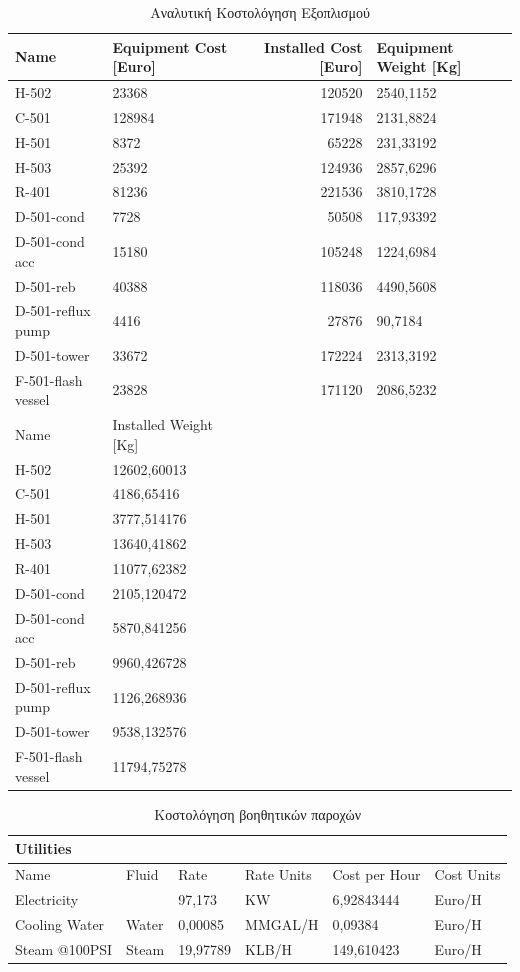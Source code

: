 \documentclass[11pt]{article}
\begin{document}
\begin{table}[htbp]
\caption{Αναλυτική Κοστολόγηση Εξοπλισμού}
\centering
\begin{tabular}{llrl}
\hline
Name & Equipment Cost [Euro] & Installed Cost [Euro] & Equipment Weight [Kg]\\
\hline
H-502 & 23368 & 120520 & 2540,1152\\
C-501 & 128984 & 171948 & 2131,8824\\
H-501 & 8372 & 65228 & 231,33192\\
H-503 & 25392 & 124936 & 2857,6296\\
R-401 & 81236 & 221536 & 3810,1728\\
D-501-cond & 7728 & 50508 & 117,93392\\
D-501-cond acc & 15180 & 105248 & 1224,6984\\
D-501-reb & 40388 & 118036 & 4490,5608\\
D-501-reflux pump & 4416 & 27876 & 90,7184\\
D-501-tower & 33672 & 172224 & 2313,3192\\
F-501-flash vessel & 23828 & 171120 & 2086,5232\\
\hline
Name & Installed Weight [Kg] &  & \\
\hline
H-502 & 12602,60013 &  & \\
C-501 & 4186,65416 &  & \\
H-501 & 3777,514176 &  & \\
H-503 & 13640,41862 &  & \\
R-401 & 11077,62382 &  & \\
D-501-cond & 2105,120472 &  & \\
D-501-cond acc & 5870,841256 &  & \\
D-501-reb & 9960,426728 &  & \\
D-501-reflux pump & 1126,268936 &  & \\
D-501-tower & 9538,132576 &  & \\
F-501-flash vessel & 11794,75278 &  & \\
\hline
\end{tabular}
\end{table}

\begin{table}[htbp]
\caption{Κοστολόγηση βοηθητικών παροχών}
\centering
\begin{tabular}{llllll}
Utilities &  &  &  &  & \\
\hline
Name & Fluid & Rate & Rate Units & Cost per Hour & Cost Units\\
Electricity &  & 97,173 & KW & 6,92843444 & Euro/H\\
Cooling Water & Water & 0,00085 & MMGAL/H & 0,09384 & Euro/H\\
Steam @100PSI & Steam & 19,97789 & KLB/H & 149,610423 & Euro/H\\
\end{tabular}
\end{table}
\end{document}
